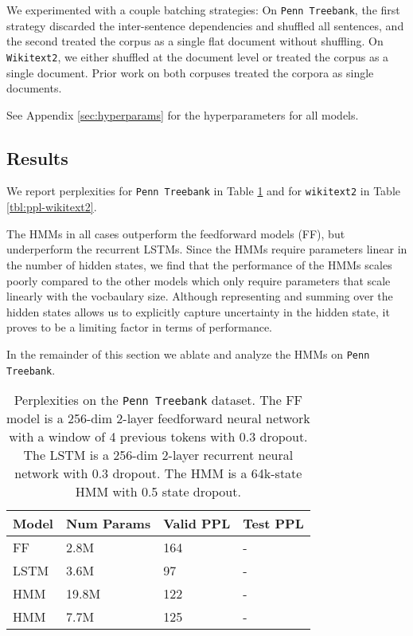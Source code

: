 \documentclass[11pt,a4paper]{article}
\begin{document}
We experimented with a couple batching strategies:
On \texttt{Penn Treebank},
the first strategy discarded the inter-sentence dependencies and shuffled all sentences,
and the second treated the corpus as a single flat document without shuffling.
On \texttt{Wikitext2}, we either shuffled at the document level or treated the corpus as a
single document.
Prior work on both corpuses treated the corpora as single documents.

See Appendix \ref{sec:hyperparams} for the hyperparameters for all models.

\subsection{Results}
We report perplexities 
for \texttt{Penn Treebank} in Table \ref{tbl:ppl-ptb} and for 
\texttt{wikitext2} in Table \ref{tbl:ppl-wikitext2}.

The HMMs in all cases outperform the feedforward models (FF),
but underperform the recurrent LSTMs.
Since the HMMs require parameters linear in the number of hidden states,
we find that the performance of the HMMs scales poorly compared to the other models
which only require parameters that scale linearly with the vocbaulary size.
Although representing and summing over the hidden states
allows us to explicitly capture uncertainty in the hidden state,
it proves to be a limiting factor in terms of performance.

In the remainder of this section we ablate and analyze the HMMs on \texttt{Penn Treebank}.


\begin{table}[!t]
\centering
\caption{\label{tbl:ppl-ptb}
Perplexities on the \texttt{Penn Treebank} dataset.
The FF model is a 256-dim 2-layer feedforward neural network
with a window of 4 previous tokens with 0.3 dropout.
The LSTM is a 256-dim 2-layer recurrent neural network with 0.3 dropout.
The HMM is a 64k-state HMM with 0.5 state dropout.
}
\begin{tabular}{llll}
\toprule
Model & Num Params & Valid PPL & Test PPL\\
\midrule
FF    & 2.8M       & 164         & -       \\
LSTM  & 3.6M       & 97          & -       \\
HMM   & 19.8M      & 122         & -       \\
HMM   & 7.7M       & 125         & -       \\
\bottomrule
\end{tabular}
\end{table}
\end{document}
